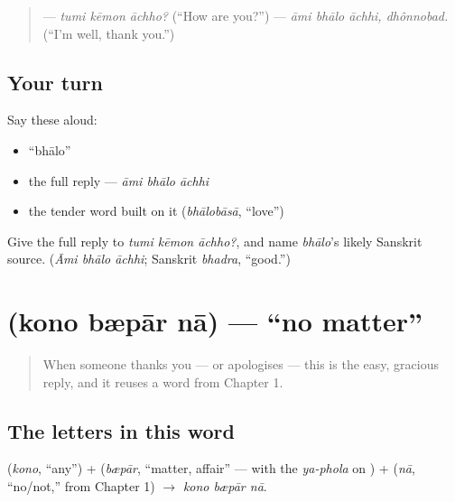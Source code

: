 \begin{quote}
— \emph{tumi kēmon āchho?} (\textquotedblleft{}How are you?\textquotedblright{}) — \emph{āmi bhālo āchhi, dhônnobad.} (\textquotedblleft{}I'm well, thank you.\textquotedblright{})
\end{quote}

\subsection*{Your turn}
Say these aloud:

\begin{itemize}
\raggedright
  \item \textquotedblleft{}bhālo\textquotedblright{}
  \item the full reply — \emph{āmi bhālo āchhi}
  \item the tender word built on it (\emph{bhālobāsā}, \textquotedblleft{}love\textquotedblright{})
\end{itemize}

\begin{tcolorbox}[breakable,colback=teal!4,colframe=teal!35!black,title={Before you move on}]
Give the full reply to \emph{tumi kēmon āchho?}, and name \emph{bhālo}'s likely Sanskrit source. (\emph{Āmi bhālo āchhi}; Sanskrit \emph{bhadra}, \textquotedblleft{}good.\textquotedblright{})
\end{tcolorbox}
\section[\texorpdfstring{\bn{কোনো} \bn{ব্যাপার} \bn{না} (kono bæpār nā)}{কোনো ব্যাপার না (kono bæpār nā)}]{   (kono bæpār nā) — \textquotedblleft{}no matter\textquotedblright{}}

\label{lesson:BN-C03-kono-bepar-na}



\begin{quote}
When someone thanks you — or apologises — this is the easy, gracious reply, and it reuses a word from Chapter 1.
\end{quote}

\subsection*{The letters in this word}
\textbf{} (\emph{kono}, \textquotedblleft{}any\textquotedblright{}) + \textbf{} (\emph{bæpār}, \textquotedblleft{}matter, affair\textquotedblright{} — with the \emph{ya-phola} on \textbf{}) + \textbf{} (\emph{nā}, \textquotedblleft{}no/not,\textquotedblright{} from Chapter 1) $\to$ \emph{kono bæpār nā}.

